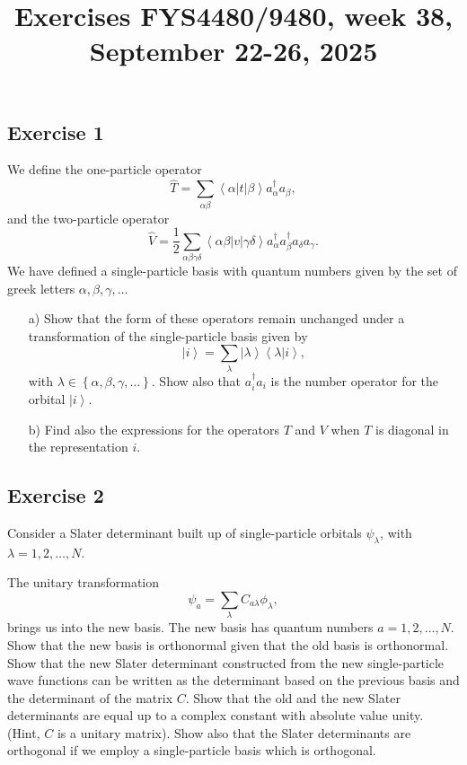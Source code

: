 \documentclass[prc]{revtex4}
\newcommand{\bra}[1]{\left\langle #1 \right|}
\newcommand{\ket}[1]{\left| #1 \right\rangle}
\begin{document}
\title{Exercises FYS4480/9480, week 38, September 22-26, 2025}
\maketitle



\subsection*{Exercise 1}
We define the one-particle operator
\[
\hat{T}={\displaystyle
\sum_{\alpha\beta}}\bra{\alpha}t\ket{\beta}a_{\alpha}^
{\dagger}a_{\beta},
\]
and the two-particle operator
\[
\hat{V}=
\frac{1}{2}{\displaystyle
\sum_{\alpha\beta\gamma\delta}}\bra{\alpha\beta}
v\ket{\gamma\delta}a_{\alpha}^{\dagger}a_{\beta}^{\dagger}
a_{\delta}a_{\gamma}.
\]
We have defined a single-particle basis with quantum numbers given by the set of greek letters $\alpha,\beta,\gamma,\dots$

\begin{enumerate}
\item[a)] Show that the form of these operators remain unchanged under 
a transformation  of the single-particle basis given by 
\[
\ket{i}=\sum_{\lambda}\ket{\lambda}\left\langle \lambda | i \right\rangle,
\]
with $\lambda\in \left\{\alpha,\beta,\gamma,\dots\right\}$. 
Show also that
$a_{i}^{\dagger}a_{i}$ is the number operator
for  the orbital $\ket{i}$. 
\item[b)] Find also the expressions for the operators
$T$ and $V$ when $T$ is diagonal in the representation
$i$. 
\end{enumerate}



\subsection*{Exercise 2}
Consider a Slater determinant built up of single-particle orbitals $\psi_{\lambda}$, 
with $\lambda = 1,2,\dots,N$.

The unitary transformation
\[
\psi_a  = \sum_{\lambda} C_{a\lambda}\phi_{\lambda},
\]
brings us into the new basis.  
The new basis has quantum numbers $a=1,2,\dots,N$.
Show that the new basis is orthonormal given that the old basis is orthonormal.
Show that the new Slater determinant constructed from the new single-particle wave functions can be
written as the determinant based on the previous basis and the determinant of the matrix $C$.
Show that the old and the new Slater determinants are equal up to a complex constant with absolute value unity.
(Hint, $C$ is a unitary matrix).  Show also that the Slater determinants are orthogonal if we employ a single-particle basis which is orthogonal.
\end{document}
